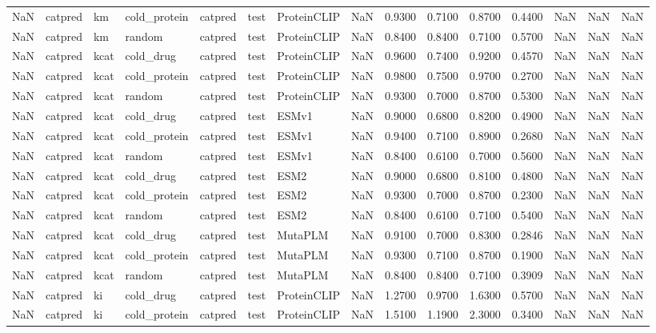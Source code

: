 \begin{tabular}{rlllllllrrrrrrr}
NaN & catpred & km & cold_protein & catpred & test & ProteinCLIP & NaN & 0.9300 & 0.7100 & 0.8700 & 0.4400 & NaN & NaN & NaN \\
NaN & catpred & km & random & catpred & test & ProteinCLIP & NaN & 0.8400 & 0.8400 & 0.7100 & 0.5700 & NaN & NaN & NaN \\
NaN & catpred & kcat & cold_drug & catpred & test & ProteinCLIP & NaN & 0.9600 & 0.7400 & 0.9200 & 0.4570 & NaN & NaN & NaN \\
NaN & catpred & kcat & cold_protein & catpred & test & ProteinCLIP & NaN & 0.9800 & 0.7500 & 0.9700 & 0.2700 & NaN & NaN & NaN \\
NaN & catpred & kcat & random & catpred & test & ProteinCLIP & NaN & 0.9300 & 0.7000 & 0.8700 & 0.5300 & NaN & NaN & NaN \\
NaN & catpred & kcat & cold_drug & catpred & test & ESMv1 & NaN & 0.9000 & 0.6800 & 0.8200 & 0.4900 & NaN & NaN & NaN \\
NaN & catpred & kcat & cold_protein & catpred & test & ESMv1 & NaN & 0.9400 & 0.7100 & 0.8900 & 0.2680 & NaN & NaN & NaN \\
NaN & catpred & kcat & random & catpred & test & ESMv1 & NaN & 0.8400 & 0.6100 & 0.7000 & 0.5600 & NaN & NaN & NaN \\
NaN & catpred & kcat & cold_drug & catpred & test & ESM2 & NaN & 0.9000 & 0.6800 & 0.8100 & 0.4800 & NaN & NaN & NaN \\
NaN & catpred & kcat & cold_protein & catpred & test & ESM2 & NaN & 0.9300 & 0.7000 & 0.8700 & 0.2300 & NaN & NaN & NaN \\
NaN & catpred & kcat & random & catpred & test & ESM2 & NaN & 0.8400 & 0.6100 & 0.7100 & 0.5400 & NaN & NaN & NaN \\
NaN & catpred & kcat & cold_drug & catpred & test & MutaPLM & NaN & 0.9100 & 0.7000 & 0.8300 & 0.2846 & NaN & NaN & NaN \\
NaN & catpred & kcat & cold_protein & catpred & test & MutaPLM & NaN & 0.9300 & 0.7100 & 0.8700 & 0.1900 & NaN & NaN & NaN \\
NaN & catpred & kcat & random & catpred & test & MutaPLM & NaN & 0.8400 & 0.8400 & 0.7100 & 0.3909 & NaN & NaN & NaN \\
NaN & catpred & ki & cold_drug & catpred & test & ProteinCLIP & NaN & 1.2700 & 0.9700 & 1.6300 & 0.5700 & NaN & NaN & NaN \\
NaN & catpred & ki & cold_protein & catpred & test & ProteinCLIP & NaN & 1.5100 & 1.1900 & 2.3000 & 0.3400 & NaN & NaN & NaN \\

\end{tabular}
